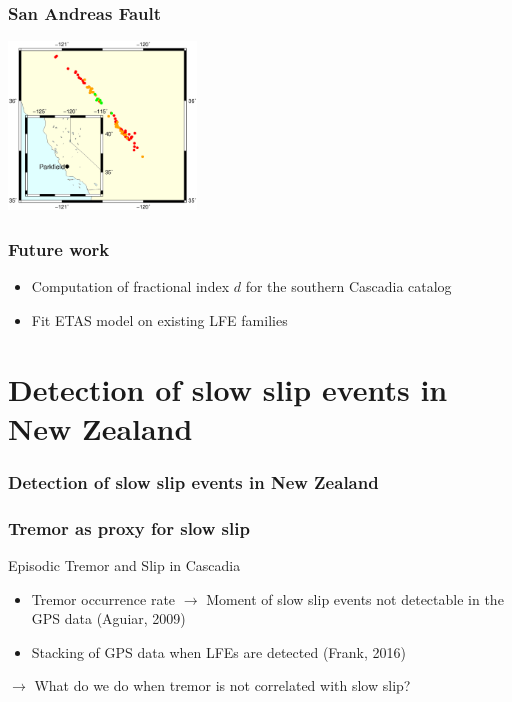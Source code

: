 \documentclass{beamer}
\begin{document}
	\begin{frame}
		\frametitle{San Andreas Fault}
		\begin{center}
			\includegraphics[width=5cm, trim={1cm 2cm 1cm 4cm}, clip]{other/sanandreas.eps}
		\end{center}
	\end{frame}

	\begin{frame}
		\frametitle{Future work}
		\begin{itemize}
			\item Computation of fractional index $d$ for the southern Cascadia catalog
			\item Fit ETAS model on existing LFE families
		\end{itemize}
	\end{frame}
		

	\section{Detection of slow slip events in New Zealand}

	\begin{frame}
		\frametitle{Detection of slow slip events in New Zealand}
	\end{frame}

	\begin{frame}
		\frametitle{Tremor as proxy for slow slip}
		Episodic Tremor and Slip in Cascadia
		\begin{itemize}
			\item Tremor occurrence rate $\rightarrow$ Moment of slow slip events not detectable in the GPS data (Aguiar, 2009)
			\item Stacking of GPS data when LFEs are detected (Frank, 2016)
		\end{itemize}
		$\rightarrow$ What do we do when tremor is not correlated with slow slip?
	\end{frame}
		
\end{document}

